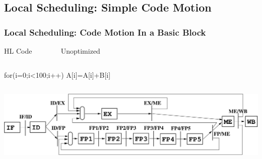 \documentclass{beamer}
\begin{document}
\subsection{Local Scheduling: Simple Code Motion}

\begin{frame}[fragile,t]
    \frametitle{Local Scheduling: Code Motion In a Basic Block}

\begin{block}{HL Code{\tt~~~~~~~~}Unoptimized}\vspace{-2ex}
\begin{columns}
\begin{colorcode}[fontsize=\scriptsize]
for(i=0;i<100;i++)
  A[i]=A[i]+B[i]
\end{colorcode} 
\begin{colorcode}[fontsize=\scriptsize]

\end{colorcode} 
\end{columns}
\end{block}

\bigskip
\bigskip

\includegraphics[width=53ex]{Figures/SimpleOoOPipeline}

\end{frame}
\end{document}
